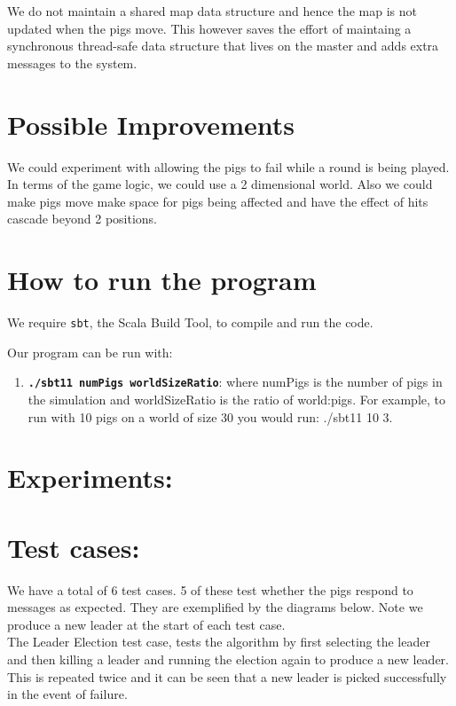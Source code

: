 \documentclass[]{article}
\begin{document}
We do not maintain a shared map data structure and hence the map is not updated
when the pigs move. This however saves the effort of maintaing a synchronous
thread-safe data structure that lives on the master and adds extra messages to
the system.

\section{Possible Improvements}

We could experiment with allowing the pigs to fail while a round is being played. 
In terms of the game logic, we could use a 2
dimensional world. Also we could make pigs move make space for pigs
being affected and have the effect of hits cascade beyond 2 positions.

\section{How to run the program}

We require \texttt{sbt}, the Scala Build Tool, to compile and run the code.

Our program can be run with:

\begin{enumerate}[1.]
\item
  \textbf{\texttt{./sbt11 numPigs worldSizeRatio}}: where numPigs is the number of pigs in the simulation and worldSizeRatio is the ratio of world:pigs. For example, to run with 10 pigs on a world of size 30 you would run: ./sbt11 10 3.
\end{enumerate}

\section{Experiments:}

\pagebreak

\section{Test cases:}
We have a total of 6 test cases. 5 of these test whether the pigs respond to messages as expected. They are exemplified by the diagrams below. Note we produce a new leader at the start of each test case.\\
The Leader Election test case, tests the algorithm by first selecting the leader and then killing a leader and running the election again to produce a new leader. This is repeated twice and it can be seen that a new leader is picked successfully in the event of failure. 
\end{document}
